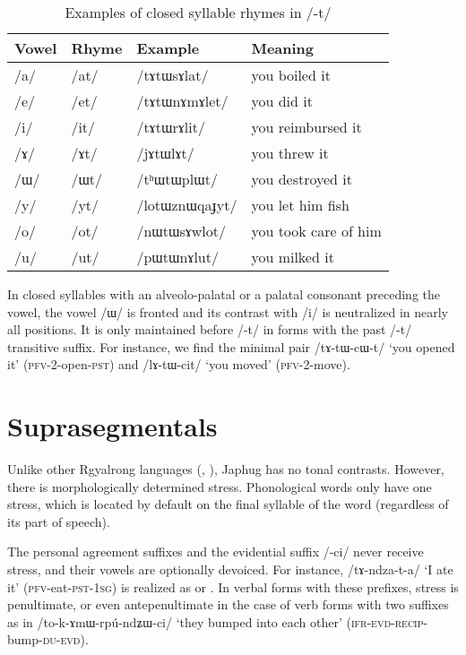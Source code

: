 \documentclass[oneside,a4paper,11pt]{article}
\newcommand{\ipa}[1]{\mbox{\phon/#1/}}
\newcommand{\phonet}[1]{\mbox{\phon[#1]}}
\begin{document}
\begin{table}
 \caption{Examples of closed syllable rhymes in \ipa{-t}} \label{tab:t.rhymes}  \centering
\begin{tabular}{llll}
\toprule
Vowel & Rhyme & Example & Meaning\\
\midrule
\ipa{a} &	   	\ipa{at} &\ipa{tɤtɯsɤlat} &you boiled it\\
\ipa{e} &	  	\ipa{et} &\ipa{tɤtɯnɤmɤlet} & you did it\\
\ipa{i} &	   	\ipa{it} &\ipa{tɤtɯrɤlit} & you reimbursed it\\
\ipa{ɤ} &	   	\ipa{ɤt} &\ipa{jɤtɯlɤt} & you threw it\\
\ipa{ɯ} &	   	\ipa{ɯt} &\ipa{tʰɯtɯplɯt} & you destroyed it \\
\ipa{y} &	 \ipa{yt} &\ipa{lotɯznɯqaɟyt} & you let him fish\\
\ipa{o} & 	\ipa{ot} &\ipa{nɯtɯsɤwlot} & you took care of him\\
\ipa{u} & 	\ipa{ut} & \ipa{pɯtɯnɤlut} & you milked it\\
\bottomrule
\end{tabular}
\end{table}

In closed syllables with an alveolo-palatal or a palatal consonant preceding the vowel, the vowel \ipa{ɯ} is fronted and its contrast with \ipa{i} is neutralized in nearly all positions. It is only maintained before \ipa{-t} in forms with the past \ipa{-t} transitive suffix. For instance, we find the minimal pair \ipa{tɤ-tɯ-cɯ-t} `you opened it' (\textsc{pfv}-2-open-\textsc{pst}) and \ipa{lɤ-tɯ-cit} `you moved' (\textsc{pfv}-2-move).
    
     \section{Suprasegmentals}
Unlike other Rgyalrong languages (\citealt{jackson05yingao}, \citealt{linyj12tone}), Japhug has no tonal contrasts. However, there is morphologically determined stress. Phonological words only have one stress, which is located by default on the final syllable of the word (regardless of its part of speech).

The personal agreement suffixes and the evidential suffix \ipa{-ci} never receive stress, and their vowels are optionally devoiced. For instance, \ipa{tɤ-ndza-t-a} `I ate it' (\textsc{pfv}-eat-\textsc{pst-1sg}) is realized as \phonet{tɤndzátḁ} or \phonet{tɤndzáta}. In verbal forms with these prefixes, stress is penultimate, or even antepenultimate in the case of verb forms with two suffixes as in \ipa{to-k-ɤmɯ-rpú-ndʑɯ-ci} `they bumped into each other' (\textsc{ifr}-\textsc{evd}-\textsc{recip}-bump-\textsc{du-evd}).
\end{document}
